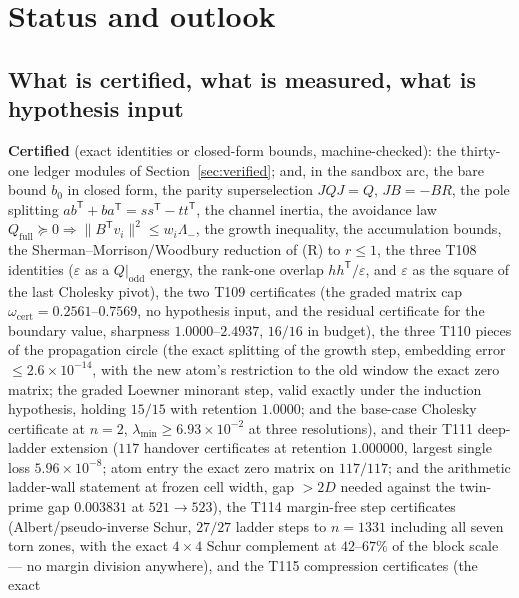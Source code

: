 \documentclass[11pt,a4paper]{article}
\newcommand{\Qfull}{Q_{\mathrm{full}}}
\begin{document}
\section{Status and outlook}\label{sec:status}
\subsection{What is certified, what is measured, what is hypothesis input}
\begin{keybox}
\textbf{Certified} (exact identities or closed-form bounds, machine-checked): the thirty-one ledger modules
of Section~\ref{sec:verified}; and, in the sandbox arc, the bare bound $b_0$ in closed form, the parity
superselection $JQJ=Q$, $JB=-BR$, the pole splitting
$ab^{\mathsf T}+ba^{\mathsf T}=ss^{\mathsf T}-tt^{\mathsf T}$, the channel inertia, the avoidance law
$\Qfull\succeq0\Rightarrow\|B^{\mathsf T}v_i\|^2\le w_i\Lambda_-$, the growth inequality, the
accumulation bounds, the Sherman--Morrison/Woodbury reduction of (R) to $r\le1$, the three T108
identities ($\varepsilon$ as a $Q|_{\mathrm{odd}}$ energy, the rank-one overlap $hh^{\mathsf T}/
\varepsilon$, and $\varepsilon$ as the square of the last Cholesky pivot), the two T109
certificates (the graded matrix cap $\omega_{\mathrm{cert}}=0.2561$--$0.7569$, no hypothesis input,
and the residual certificate for the boundary value, sharpness $1.0000$--$2.4937$, $16/16$ in
budget), the three T110 pieces of the propagation circle (the exact splitting of the growth step,
embedding error $\le2.6\times10^{-14}$, with the new atom's restriction to the old window the exact
zero matrix; the graded Loewner minorant step, valid exactly under the induction hypothesis, holding
$15/15$ with retention $1.0000$; and the base-case Cholesky certificate at $n=2$,
$\lambda_{\min}\ge6.93\times10^{-2}$ at three resolutions), and their T111 deep-ladder extension
($117$ handover certificates at retention $1.000000$, largest single loss $5.96\times10^{-8}$; atom
entry the exact zero matrix on $117/117$; and the arithmetic ladder-wall statement at frozen cell
width, gap $>2D$ needed against the twin-prime gap $0.003831$ at $521\to523$), the T114
margin-free step certificates (Albert/pseudo-inverse Schur, $27/27$ ladder steps to $n=1331$
including all seven torn zones, with the exact $4\times4$ Schur complement at $42$--$67\%$ of the
block scale --- no margin division anywhere), and the T115 compression certificates (the exact

\end{keybox}
\end{document}
